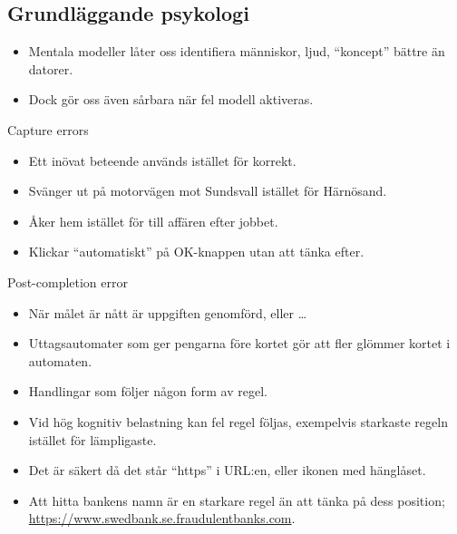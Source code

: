 \documentclass{beamer}
\begin{document}
\subsection{Grundläggande psykologi}

\begin{frame}{\insertsubsectionhead}
  \begin{itemize}
    \item Mentala modeller låter oss identifiera människor, ljud, 
      \enquote{koncept} bättre än datorer.

    \item Dock gör oss även sårbara när fel modell aktiveras.

  \end{itemize}
\end{frame}

\begin{frame}{\insertsubsectionhead}
  \begin{block}{Capture errors}
    \begin{itemize}
      \item Ett inövat beteende används istället för korrekt.
      \item Svänger ut på motorvägen mot Sundsvall istället för Härnösand.
      \item Åker hem istället för till affären efter jobbet.
      \item Klickar \enquote{automatiskt} på OK-knappen utan att tänka efter.
    \end{itemize}
  \end{block}
  \begin{block}{Post-completion error}
    \begin{itemize}
      \item När målet är nått är uppgiften genomförd, eller \dots
      \item Uttagsautomater som ger pengarna före kortet gör att fler glömmer 
        kortet i automaten.
    \end{itemize}
  \end{block}
\end{frame}

\begin{frame}{\insertsubsectionhead}
  \begin{itemize}
    \item Handlingar som följer någon form av regel.
    \item Vid hög kognitiv belastning kan fel regel följas, exempelvis 
      starkaste regeln istället för lämpligaste.
  \end{itemize}
  \begin{example}
    \begin{itemize}
      \item Det är säkert då det står \enquote{https} i URL:en, eller ikonen 
        med hänglåset.
      \item Att hitta bankens namn är en starkare regel än att tänka på dess 
        position; \url{https://www.swedbank.se.fraudulentbanks.com}.
    \end{itemize}
  \end{example}
\end{frame}
\end{document}
